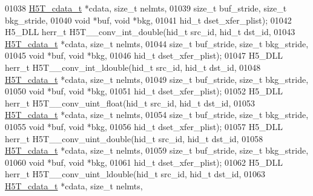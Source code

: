 \begin{DoxyCode}
01038                      \hyperlink{struct_h5_t__cdata__t}{H5T\_cdata\_t} *cdata, \textcolor{keywordtype}{size\_t} nelmts,
01039                      \textcolor{keywordtype}{size\_t} buf\_stride, \textcolor{keywordtype}{size\_t} bkg\_stride,
01040                                      \textcolor{keywordtype}{void} *buf, \textcolor{keywordtype}{void} *bkg,
01041                                      hid\_t dset\_xfer\_plist);
01042 H5\_DLL herr\_t H5T\_\_conv\_int\_double(hid\_t src\_id, hid\_t dst\_id,
01043                      \hyperlink{struct_h5_t__cdata__t}{H5T\_cdata\_t} *cdata, \textcolor{keywordtype}{size\_t} nelmts,
01044                      \textcolor{keywordtype}{size\_t} buf\_stride, \textcolor{keywordtype}{size\_t} bkg\_stride,
01045                                      \textcolor{keywordtype}{void} *buf, \textcolor{keywordtype}{void} *bkg,
01046                                      hid\_t dset\_xfer\_plist);
01047 H5\_DLL herr\_t H5T\_\_conv\_int\_ldouble(hid\_t src\_id, hid\_t dst\_id,
01048                      \hyperlink{struct_h5_t__cdata__t}{H5T\_cdata\_t} *cdata, \textcolor{keywordtype}{size\_t} nelmts,
01049                      \textcolor{keywordtype}{size\_t} buf\_stride, \textcolor{keywordtype}{size\_t} bkg\_stride,
01050                                      \textcolor{keywordtype}{void} *buf, \textcolor{keywordtype}{void} *bkg,
01051                                      hid\_t dset\_xfer\_plist);
01052 H5\_DLL herr\_t H5T\_\_conv\_uint\_float(hid\_t src\_id, hid\_t dst\_id,
01053                      \hyperlink{struct_h5_t__cdata__t}{H5T\_cdata\_t} *cdata, \textcolor{keywordtype}{size\_t} nelmts,
01054                      \textcolor{keywordtype}{size\_t} buf\_stride, \textcolor{keywordtype}{size\_t} bkg\_stride,
01055                                      \textcolor{keywordtype}{void} *buf, \textcolor{keywordtype}{void} *bkg,
01056                                      hid\_t dset\_xfer\_plist);
01057 H5\_DLL herr\_t H5T\_\_conv\_uint\_double(hid\_t src\_id, hid\_t dst\_id,
01058                      \hyperlink{struct_h5_t__cdata__t}{H5T\_cdata\_t} *cdata, \textcolor{keywordtype}{size\_t} nelmts,
01059                      \textcolor{keywordtype}{size\_t} buf\_stride, \textcolor{keywordtype}{size\_t} bkg\_stride,
01060                                      \textcolor{keywordtype}{void} *buf, \textcolor{keywordtype}{void} *bkg,
01061                                      hid\_t dset\_xfer\_plist);
01062 H5\_DLL herr\_t H5T\_\_conv\_uint\_ldouble(hid\_t src\_id, hid\_t dst\_id,
01063                      \hyperlink{struct_h5_t__cdata__t}{H5T\_cdata\_t} *cdata, \textcolor{keywordtype}{size\_t} nelmts,

\end{DoxyCode}
